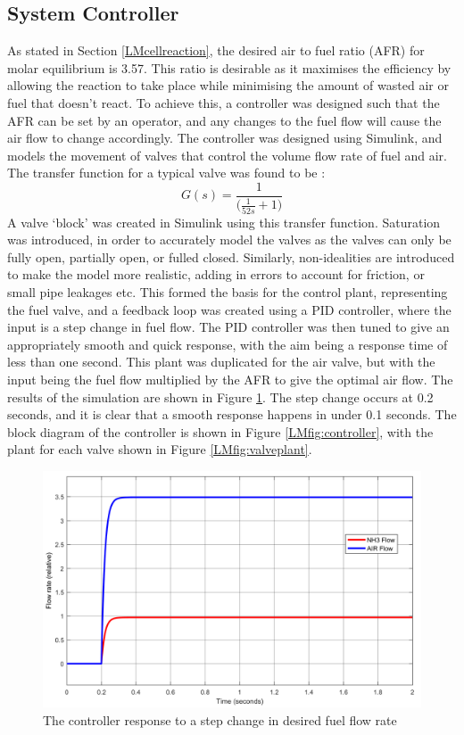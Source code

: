 \subsection{System Controller}

As stated in Section \ref{LMcellreaction}, the desired air to fuel ratio (AFR) for molar equilibrium is 3.57. This ratio is desirable as it maximises the efficiency by allowing the reaction to take place while minimising the amount of wasted air or fuel that doesn't react. To achieve this, a controller was designed such that the AFR can be set by an operator, and any changes to the fuel flow will cause the air flow to change accordingly. The controller was designed using Simulink, and models the movement of valves that control the volume flow rate of fuel and air.
The transfer function for a typical valve was found to be \cite{LM17}:
\begin{equation}
G(s) = \frac{1}{\Big (\frac{1}{52s}+1 \Big )}						
\end{equation}
A valve `block' was created in Simulink using this transfer function. Saturation was introduced, in order to accurately model the valves as the valves can only be fully open, partially open, or fulled closed. Similarly, non-idealities are introduced to make the model more realistic, adding in errors to account for friction, or small pipe leakages etc. This formed the basis for the control plant, representing the fuel valve, and a feedback loop was created using a PID controller, where the input is a step change in fuel flow. The PID controller was then tuned to give an appropriately smooth and quick response, with the aim being a response time of less than one second. This plant was duplicated for the air valve, but with the input being the fuel flow multiplied by the AFR to give the optimal air flow. The results of the simulation are shown in Figure \ref{LMfig:controlresults}. The step change occurs at 0.2 seconds, and it is clear that a smooth response happens in under 0.1 seconds. The block diagram of the controller is shown in Figure \ref{LMfig:controller}, with the plant for each valve shown in Figure \ref{LMfig:valveplant}.\\


\begin{figure}[h]
    \centering
    \includegraphics[scale=0.35]{controllerresponse.png}
    \caption{The controller response to a step change in desired fuel flow rate}
    \label{LMfig:controlresults}
\end{figure}

